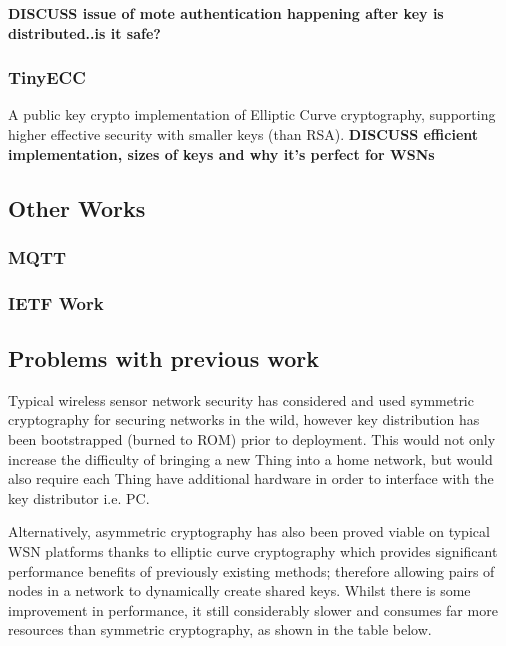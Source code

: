 \documentclass{mprop}
\begin{document}
\textbf{DISCUSS issue of mote authentication happening after key is distributed..is it safe?}
\subsubsection{TinyECC} %
\label{ssub:tinyecc}
\cite{TinyECC}
A public key crypto implementation of Elliptic Curve cryptography, supporting higher effective security with smaller keys (than RSA).
\textbf{DISCUSS efficient implementation, sizes of keys and why it's perfect for WSNs}



\subsection{Other Works} %
\label{sub:other_works}
\subsubsection{MQTT} %
\label{ssub:mqtt}

\subsubsection{IETF Work} %
\label{ssub:ietf_work}
\cite{IETF_COAP_HTTP, IETF_CORE}

\subsection{Problems with previous work} %
\label{sub:problems_with_previous_work}

Typical wireless sensor network security has considered and used symmetric cryptography\cite{TinySec,luk2007minisec, ContikiSec} for securing networks in the wild, however key distribution has been bootstrapped (burned to ROM) prior to deployment. This would not only increase the difficulty of bringing a new Thing into a home network, but would also require each Thing have additional hardware in order to interface with the key distributor i.e. PC. 

Alternatively, asymmetric cryptography has also been proved viable on typical WSN platforms thanks to elliptic curve cryptography which provides significant performance benefits of previously existing methods\cite{TinyECC}; therefore allowing pairs of nodes in a network to dynamically create shared keys. Whilst there is some improvement in performance, it still considerably slower and consumes far more resources than symmetric cryptography, as shown in the table below.
\end{document}
